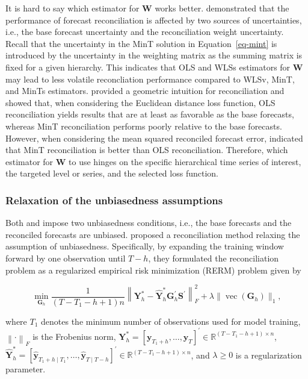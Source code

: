 \documentclass[11pt,a4paper,]{article}
\begin{document}
It is hard to say which estimator for \(\boldsymbol{W}\) works better.
\textcite{Pritularga2021-lz} demonstrated that the performance of
forecast reconciliation is affected by two sources of uncertainties,
i.e., the base forecast uncertainty and the reconciliation weight
uncertainty. Recall that the uncertainty in the MinT solution in
Equation~\ref{eq-mint} is introduced by the uncertainty in the weighting
matrix as the summing matrix is fixed for a given hierarchy. This
indicates that OLS and WLSs estimators for \(\boldsymbol{W}\) may lead
to less volatile reconcliation performance compared to WLSv, MinT, and
MinTs estimators. \textcite{Panagiotelis2021-mf} provided a geometric
intuition for reconciliation and showed that, when considering the
Euclidean distance loss function, OLS reconciliation yields results that
are at least as favorable as the base forecasts, whereas MinT
reconciliation performs poorly relative to the base forecasts. However,
when considering the mean squared reconciled forecast error,
\textcite{Wickramasuriya2021-am} indicated that MinT reconciliation is
better than OLS reconciliation. Therefore, which estimator for
\(\boldsymbol{W}\) to use hinges on the specific hierarchical time
series of interest, the targeted level or series, and the selected loss
function.

\hypertarget{relaxation-of-the-unbiasedness-assumptions}{%
\subsubsection{Relaxation of the unbiasedness
assumptions}\label{relaxation-of-the-unbiasedness-assumptions}}

Both \textcite{Hyndman2011-sd} and \textcite{Wickramasuriya2019-fc}
impose two unbiasedness conditions, i.e., the base forecasts and the
reconciled forecasts are unbiased. \textcite{Ben_Taieb2019-be} proposed
a reconciliation method relaxing the assumption of unbiasedness.
Specifically, by expanding the training window forward by one
observation until \(T-h\), they formulated the reconciliation problem as
a regularized empirical risk minimization (RERM) problem given by

\[
\min _{\boldsymbol{G}_h} \frac{1}{(T-T_1-h+1)n}\left\|\boldsymbol{Y}_{h}^{*}-\hat{\boldsymbol{Y}}_{h}^{*} \mathbf{G}_{h}^{\prime} \boldsymbol{S}^{\prime}\right\|_F^2+\lambda\|\operatorname{vec}( \boldsymbol{G}_h)\|_1,
\]

where \(T_1\) denotes the minimum number of observations used for model
training, \(\left\| \cdot \right\|_F\) is the Frobenius norm,
\(\boldsymbol{Y}_{h}^{*}=\left[\boldsymbol{y}_{T_1+h}, \ldots, \boldsymbol{y}_T\right]^{\prime} \in \mathbb{R}^{\left(T-T_1-h+1\right) \times n}\),
\(\hat{\boldsymbol{Y}}_{h}^{*}=\left[\hat{\boldsymbol{y}}_{T_1+h \mid T_1}, \ldots, \hat{\boldsymbol{y}}_{T \mid T-h}\right]^{\prime} \in \mathbb{R}^{\left(T-T_1-h+1\right) \times n}\),
and \(\lambda \geq 0\) is a regularization parameter.
\end{document}
